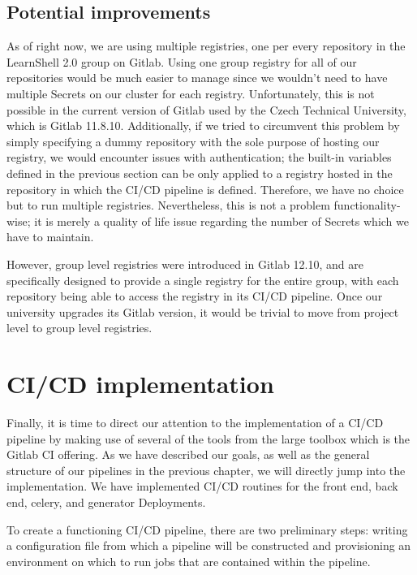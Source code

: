 \documentclass[thesis=B,english]{FITthesis}[2019/12/23]
\begin{document}
\subsection{Potential improvements}

As of right now, we are using multiple registries, one per every repository in the LearnShell 2.0 group on Gitlab. Using one group registry for all of our repositories would be much easier to manage since we wouldn't need to have multiple Secrets on our cluster for each registry. Unfortunately, this is not possible in the current version of Gitlab used by the Czech Technical University, which is Gitlab 11.8.10. Additionally, if we tried to circumvent this problem by simply specifying a dummy repository with the sole purpose of hosting our registry, we would encounter issues with authentication; the built-in variables defined in the previous section can be only applied to a registry hosted in the repository in which the CI/CD pipeline is defined. Therefore, we have no choice but to run multiple registries. Nevertheless, this is not a problem functionality-wise; it is merely a quality of life issue regarding the number of Secrets which we have to maintain.

However, group level registries were introduced in Gitlab 12.10, and are specifically designed to provide a single registry for the entire group, with each repository being able to access the registry in its CI/CD pipeline. Once our university upgrades its Gitlab version, it would be trivial to move from project level to group level registries.


\section{CI/CD implementation}

Finally, it is time to direct our attention to the implementation of a CI/CD pipeline by making use of several of the tools from the large toolbox which is the Gitlab CI offering. As we have described our goals, as well as the general structure of our pipelines in the previous chapter, we will directly jump into the implementation. We have implemented CI/CD routines for the front end, back end, celery, and generator Deployments.

To create a functioning CI/CD pipeline, there are two preliminary steps: writing a configuration file from which a pipeline will be constructed and provisioning an environment on which to run jobs that are contained within the pipeline.
\end{document}
